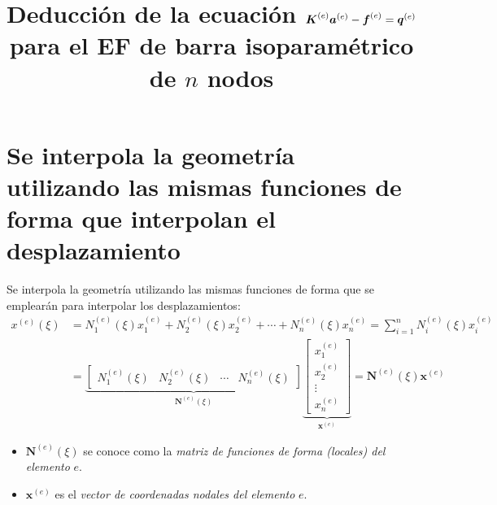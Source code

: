\documentclass[12pt,letterpaper]{article}
\title{Deducción de la ecuación $\ma{K}^{(e)} \ve{a}^{(e)} - \ma{f}^{(e)} = \ma{q}^{(e)}$ para el EF de barra isoparamétrico de $n$ nodos}
\date{}
\newcommand{\ve}[1]{{\boldsymbol{#1}}}
\newcommand{\ma}[1]{{\boldsymbol{#1}}}
\begin{document}
\maketitle

\section{Se interpola la geometría utilizando las mismas funciones de forma que interpolan el desplazamiento}

Se interpola la geometría utilizando las mismas funciones de forma que se emplearán para interpolar los desplazamientos:
\begin{align}
x^{(e)}(\xi) 
&= N_1^{(e)}(\xi) x_1^{(e)} + N_2^{(e)}(\xi) x_2^{(e)} + \cdots + N_n^{(e)}(\xi) x_n^{(e)} 
= \sum_{i=1}^n N_i^{(e)}(\xi) x_i^{(e)} \\
&= 
\underbrace{\begin{bmatrix}
    N_1^{(e)}(\xi) & N_2^{(e)}(\xi) & \cdots & N_n^{(e)}(\xi)
    \end{bmatrix}}_{\ma{N}^{(e)}(\xi)}
\underbrace{\begin{bmatrix}
    x_1^{(e)} \\ x_2^{(e)} \\ \vdots \\ x_n^{(e)}
    \end{bmatrix}}_{\ma{x}^{(e)}} = \ma{N}^{(e)}(\xi)  \ve{x}^{(e)}
\end{align}

\begin{itemize}
    \item $\ma{N}^{(e)}(\xi)$ se conoce como la \emph{matriz de funciones de forma (locales) del elemento} $e$.
    \item $\ve{x}^{(e)}$ es el \emph{vector de coordenadas nodales del elemento} $e$.
\end{itemize}    
\end{document}
